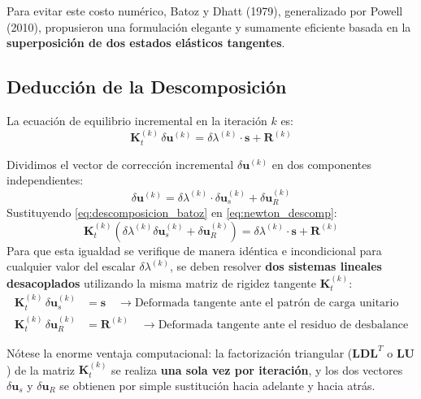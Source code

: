 \documentclass[11pt,letterpaper]{article}
\begin{document}
Para evitar este costo numérico, Batoz y Dhatt (1979), generalizado por Powell (2010), propusieron una formulación elegante y sumamente eficiente basada en la \textbf{superposición de dos estados elásticos tangentes}.

\subsection{Deducción de la Descomposición}

La ecuación de equilibrio incremental en la iteración $k$ es:
\begin{equation}
    \mathbf{K}_t^{(k)} \, \delta \mathbf{u}^{(k)} = \delta \lambda^{(k)} \cdot \mathbf{s} + \mathbf{R}^{(k)}
    \label{eq:newton_descomp}
\end{equation}

Dividimos el vector de corrección incremental $\delta \mathbf{u}^{(k)}$ en dos componentes independientes:
\begin{equation}
    \delta \mathbf{u}^{(k)} = \delta \lambda^{(k)} \cdot \delta \mathbf{u}_s^{(k)} + \delta \mathbf{u}_R^{(k)}
    \label{eq:descomposicion_batoz}
\end{equation}
Sustituyendo \eqref{eq:descomposicion_batoz} en \eqref{eq:newton_descomp}:
\begin{equation}
    \mathbf{K}_t^{(k)} \left( \delta \lambda^{(k)} \delta \mathbf{u}_s^{(k)} + \delta \mathbf{u}_R^{(k)} \right) = \delta \lambda^{(k)} \cdot \mathbf{s} + \mathbf{R}^{(k)}
\end{equation}
Para que esta igualdad se verifique de manera idéntica e incondicional para cualquier valor del escalar $\delta \lambda^{(k)}$, se deben resolver \textbf{dos sistemas lineales desacoplados} utilizando la misma matriz de rigidez tangente $\mathbf{K}_t^{(k)}$:
\begin{align}
    \mathbf{K}_t^{(k)} \, \delta \mathbf{u}_s^{(k)} &= \mathbf{s} \quad \longrightarrow \text{Deformada tangente ante el patrón de carga unitario} \label{eq:sub_s}\\
    \mathbf{K}_t^{(k)} \, \delta \mathbf{u}_R^{(k)} &= \mathbf{R}^{(k)} \quad \longrightarrow \text{Deformada tangente ante el residuo de desbalance} \label{eq:sub_r}
\end{align}

Nótese la enorme ventaja computacional: la factorización triangular ($\mathbf{L}\mathbf{D}\mathbf{L}^T$ o $\mathbf{L}\mathbf{U}$) de la matriz $\mathbf{K}_t^{(k)}$ se realiza \textbf{una sola vez por iteración}, y los dos vectores $\delta \mathbf{u}_s$ y $\delta \mathbf{u}_R$ se obtienen por simple sustitución hacia adelante y hacia atrás.
\end{document}
